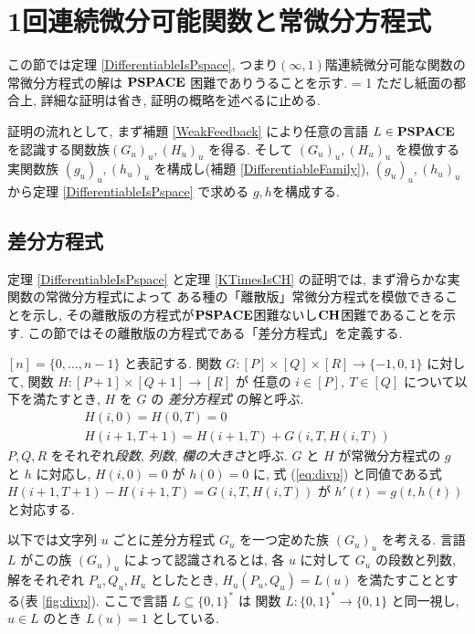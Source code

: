 \section{1回連続微分可能関数と常微分方程式}
\label{section:differentiable}

この節では定理 \ref{DifferentiableIsPspace},
つまり$(\infty, 1)$階連続微分可能な関数の常微分方程式の解は
$\mathbf{PSPACE}$ 困難でありうることを示す.
\ifnum \proc = 1
ただし紙面の都合上, 詳細な証明は省き, 証明の概略を述べるに止める.
\fi

証明の流れとして, まず補題 \ref{WeakFeedback} により任意の言語
$L \in \mathbf{PSPACE}$ を認識する関数族$(G_u)_u, (H_u)_u$ を得る.
そして $(G_u)_u, (H_u)_u$ を模倣する
実関数族 $(g_u)_u, (h_u)_u$ を構成し(補題 \ref{DifferentiableFamily}),
$(g_u)_u, (h_u)_u$ から定理 \ref{DifferentiableIsPspace} で求める $g, h$を構成する.


\subsection{差分方程式}
\label{section:divp}

定理 \ref{DifferentiableIsPspace} と定理 \ref{KTimesIsCH} の証明では,
まず滑らかな実関数の常微分方程式によって
ある種の「離散版」常微分方程式を模倣できることを示し, 
その離散版の方程式が$\mathbf{PSPACE}$困難ないし$\mathbf{CH}$困難であることを示す.
この節ではその離散版の方程式である「差分方程式」を定義する.

$[n] = \{0, \dots , n-1\}$ と表記する.
関数 $G \colon [P] \times [Q] \times [R] \to \{-1, 0, 1\}$ に対して,
関数 $H \colon [P + 1] \times [Q+1] \to [R]$ が
任意の $i \in [P],\ T \in [Q]$ について以下を満たすとき,
$H$ を $G$ の \emph{差分方程式} の解と呼ぶ.
\begin{gather}
   H(i, 0) = H(0, T) = 0 
\\
   H(i + 1, T + 1) = H(i+1, T) + G(i, T, H(i, T))  \label{eq:divp}
\end{gather}
$P, Q, R$ をそれぞれ\emph{段数}, \emph{列数}, \emph{欄の大きさ}と呼ぶ.
$G$ と $H$ が常微分方程式の $g$ と $h$ に対応し,
$H(i, 0) = 0$ が $h(0) = 0$ に,
式 (\ref{eq:divp}) と同値である式 $H(i + 1, T + 1) - H(i+1, T) = G(i, T, H(i, T))$
が $h'(t) = g(t, h(t))$ と対応する.

以下では文字列 $u$ ごとに差分方程式 $G _u$ を一つ定めた族 $(G _u) _u$ を考える. 
言語 $L$ がこの族 $(G_u)_u$ によって認識されるとは,
各 $u$ に対して $G_u$ の段数と列数, 解をそれぞれ $P_u, Q_u, H_u$ としたとき,
$H_u(P_u, Q_u) = L(u)$ を満たすこととする(表 \ref{fig:divp}).
ここで言語 $L \subseteq \{0, 1\} ^*$ は
関数 $L \colon \{0, 1\} ^* \to \{0, 1\}$ と同一視し, 
$u \in L$ のとき $L (u) = 1$ としている. 

